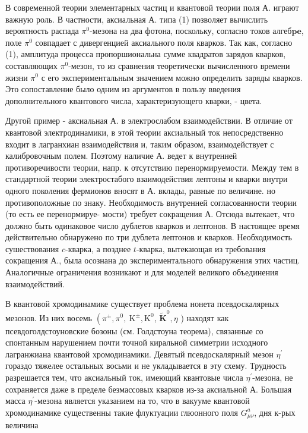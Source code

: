 \documentclass[10pt]{article}
\begin{document}
В современной теории элементарных частиц и квантовой теории поля А. играют важную роль. В частности, аксиальная А. типа (1) позволяет вычислить вероятность распада $\pi^{0}$-мезона на два фотона, поскольку, согласно токов алгеб$\boldsymbol{p e}$, поле $\pi^{0}$ совпадает с дивергенцией аксиального поля кварков. Так как, согласно (1), амплитуда процесса пропоршиональна сумме квадратов зарядов кварков, составляющих $\pi^{0}$-мезон, то из сравнения теоретически вычисленного времени жизни $\pi^{0}$ с его экспериментальным значением можно определить заряды кварков. Это сопоставление было одним из аргументов в пользу введения дополнительного квантового числа, характеризующего кварки, - цвета.



Другой пример - аксиальная А. в электрослабом взаимодействии. В отличие от квантовой электродинамики, в этой теории аксиальный ток непосредственно входит в лагранхиан взаимодействия и, таким образом, взаимодействует с калибровочным полем. Поэтому наличие А. ведет к внутренней противоречивости теории, напр. к отсутствию перенормируемости. Между тем в стандартной теории электростабого взаимодействия лептоны и кварки внутри одного поколения фермионов вносят в А. вклады, равные по величине. но противоположные по знаку. Необходимость внутренней согласованности теории (то есть ее перенормируе- мости) требует сокращения А. Отсюда вытекает, что должно быть одинаковое число дублетов кварков и лептонов. В настоящее время действительно обнаружено по три дублета лептонов и кварков. Необходимость сушествования $c$-кварка, а позднее $t$-кварка, вытекающая из требования сокращения А., была осознана до экспериментального обнаружения этих частиц. Аналогичные ограничения возникают и для моделей великого объединения взаимодействий.



В квантовой хромодинамике существует проблема нонета псевдоскалярных мезонов. Из них восемь $\left(\pi^{ \pm}, \pi^{0}, \mathrm{~K}^{ \pm}, \mathrm{K}^{0}\right.$, $\widetilde{\mathbf{K}}^{0}, \eta$ ) находят как псевдоголдстоуновские бозоны (см. Голдстоуна теорема), связанные со спонтанным нарушением почти точной киральной симметрии исходного лагранжиана квантовой хромодинамики. Девятый псевдоскалярный мезон $\eta^{\prime}$ гораздо тяжелее остальных восьми и не укладывается в эту схему. Трудность разрешается тем, что аксиальный ток, имеющий квантовые числа $\eta^{\prime}$-мезона, не сохраняется даже в пределе безмассовых кварков из-за аксиальной А. Большая масса $\eta^{\prime}$-мезона является указанием на то, что в вакууме квантовой хромодинамике существенны такие флуктуации глюонного поля $G_{\mu \nu}^{a}$, дня к-рых величина
\end{document}
